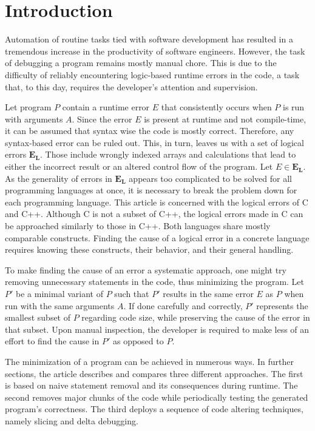 \chapter*{Introduction}

Automation of routine tasks tied with software development has resulted in a tremendous
increase in the productivity of software engineers. However, the task of debugging a program
remains mostly manual chore. This is due to the difficulty of reliably encountering logic-based
runtime errors in the code, a task that, to this day, requires the developer's attention and
supervision. \par
Let program $P$ contain a runtime error $E$ that consistently occurs when $P$ is run with
 arguments $A$. Since the error $E$ is present at runtime and not compile-time, it can be assumed
 that syntax wise the code is mostly correct. Therefore, any syntax-based error can be ruled out.
 This, in turn, leaves us with a set of logical errors $\mathbf{E_L}$. Those include wrongly indexed
 arrays and calculations
that lead to either the incorrect result or an altered control flow of the program. 
Let $E \in \mathbf{E_L}$. As the generality of errors in $\mathbf{E_L}$ appears too
 complicated to be solved for all programming languages at once, it is necessary to break
 the problem down for each programming language. This article is concerned with the logical
 errors of C and C++. Although C is not a subset of C++, the logical errors made in C can be
 approached similarly to those in C++. Both languages share mostly comparable constructs. Finding
 the cause of a logical error in a concrete language requires knowing these constructs, their
 behavior, and their general handling. \par
To make finding the cause of an error a systematic approach, one might try removing
unnecessary statements in the code, thus minimizing the program. Let $P'$ be a minimal variant
 of $P$ such that $P'$ results in the same error $E$ as $P$ when run with the same arguments
 $A$. If done carefully and correctly, $P'$ represents the smallest subset of $P$ regarding code
 size, while preserving the cause of the error in that subset. Upon manual inspection,
 the developer is
required to make less of an effort to find the cause in $P'$ as opposed to $P$. \par
The minimization of a program can be achieved in numerous ways. In further sections, the article
describes and compares three different approaches. The first is based on naive statement removal
and its consequences during runtime. The second removes major chunks of the code while
periodically testing the generated program's correctness. The third deploys a sequence of code
altering techniques, namely slicing and delta debugging.

